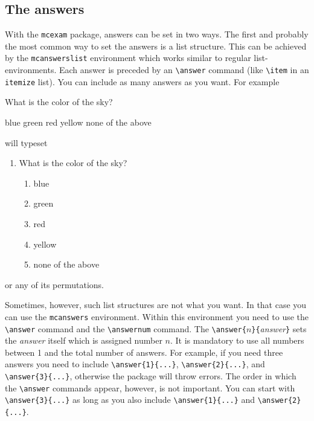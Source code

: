\documentclass{article}
\begin{document}
\subsection{The answers}

With the \verb$mcexam$ package, answers can be set in two ways. The first and probably the most common way to set the answers is a list structure. This can be achieved by the \verb$mcanswerslist$ environment which works similar to regular list-environments. Each answer is preceded by an \verb$\answer$ command (like \verb$\item$ in an \verb$itemize$ list). You can include as many answers as you want. For example
\begin{code}
\question What is the color of the sky?
  \begin{mcanswerslist}
  \answer blue
  \answer green
  \answer red
  \answer yellow
  \answer none of the above
  \end{mcanswerslist}    
\end{code}
will typeset 
\begin{enumerate}[label=\arabic{*}.,itemsep=1\baselineskip]
 \item What is the color of the sky?
 \begin{enumerate}[label=\alph{*}),noitemsep]
 \item blue
 \item green
 \item red
 \item yellow
 \item none of the above
 \end{enumerate}
\end{enumerate}
or any of its permutations.

Sometimes, however, such list structures are not what you want. In that case you can use the \verb$mcanswers$ environment. Within this environment you need to use the \verb$\answer$ command and the \verb$\answernum$ command. The \verb$\answer{$$n$\verb$}{$\emph{answer}\verb$}$ sets the \emph{answer} itself which is assigned number $n$. It is mandatory to use all numbers between 1 and the total number of answers. For example, if you need three answers you need to include \verb$\answer{1}{...}$, \verb$\answer{2}{...}$, and \verb$\answer{3}{...}$, otherwise the package will throw errors. The order in which the \verb$\answer$ commands appear, however, is not important. You can start with \verb$\answer{3}{...}$ as long as you also include \verb$\answer{1}{...}$ and \verb$\answer{2}{...}$. 
\end{document}
